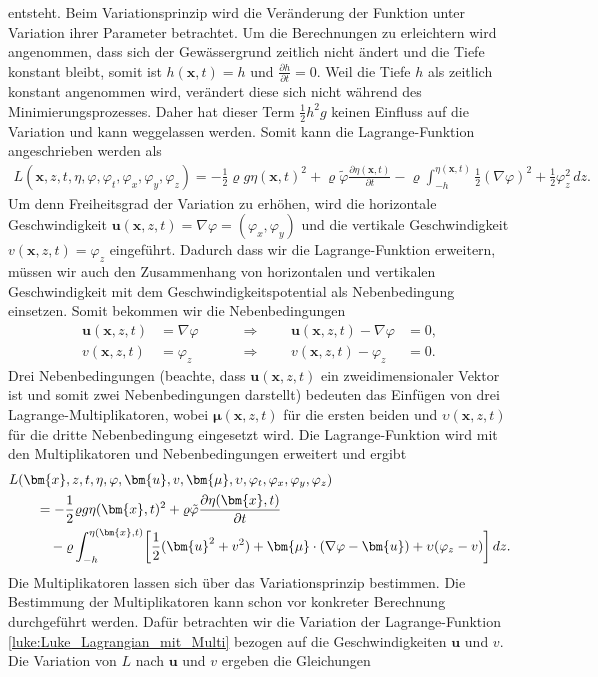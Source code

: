 entsteht.
Beim Variationsprinzip wird die Veränderung der Funktion unter Variation ihrer Parameter betrachtet.
Um die Berechnungen zu erleichtern wird angenommen, dass sich der Gewässergrund zeitlich nicht ändert und die Tiefe konstant bleibt, somit ist $h(\bm{x},t) = h$ und $\frac{\partial h}{\partial t} = 0$.
Weil die Tiefe $h$ als zeitlich konstant angenommen wird, verändert diese sich nicht während des Minimierungsprozesses.
Daher hat dieser Term $\frac{1}{2}h^2g$ keinen Einfluss auf die Variation und kann weggelassen werden.
Somit kann die Lagrange-Funktion angeschrieben werden als
\begin{align}
L(\bm{x},z,t,\eta,\varphi,\varphi_t,\varphi_x, \varphi_y, \varphi_z)
= 
-\frac{1}{2}\varrho g\eta(\bm{x},t)^2
+\varrho \tilde{\varphi}
\frac{\partial\eta(\bm{x},t)}{\partial t}
-\varrho \int_{-h}^{\eta(\bm{x},t)}
\frac{1}{2}(\nabla\varphi)^2 + \frac{1}{2}\varphi_z^2\, dz
.
\nonumber
\end{align}
Um denn Freiheitsgrad der Variation zu erhöhen, wird die horizontale Geschwindigkeit $\bm{u}(\bm{x},z,t) = \nabla\varphi = (\varphi_x, \varphi_y)$ und die vertikale Geschwindigkeit $v(\bm{x},z,t) = \varphi_z$ eingeführt. 
Dadurch dass wir die Lagrange-Funktion erweitern, müssen wir auch den Zusammenhang von horizontalen und vertikalen Geschwindigkeit mit dem Geschwindigkeitspotential als Nebenbedingung einsetzen.
Somit bekommen wir die Nebenbedingungen
\[
\begin{aligned}
	\bm{u}(\bm{x},z,t)
	&=
	\nabla\varphi
	&&&&\Rightarrow&&&
	\bm{u}(\bm{x},z,t)
	-
	\nabla\varphi
	&=
	0,
	\nonumber
	\\
	v(\bm{x},z,t)
	&=
	\varphi_z
	&&&&\Rightarrow&&&
	v(\bm{x},z,t)
	-
	\varphi_z
	&=
	0.
	\nonumber
\end{aligned}
\]
Drei Nebenbedingungen (beachte, dass $\bm{u}(\bm{x},z,t)$ ein zweidimensionaler Vektor ist und somit zwei Nebenbedingungen darstellt) bedeuten das Einfügen von drei Lagrange-Multi\-pli\-ka\-to\-ren, wobei $\bm{\mu}(\bm{x},z,t)$ für die ersten beiden und $\upsilon(\bm{x},z,t)$ für die dritte Nebenbedingung eingesetzt wird.
Die Lagrange-Funktion wird mit den Multiplikatoren und Nebenbedingungen erweitert und ergibt
\begin{align}
&L(\bm{x},z,t,\eta,\varphi,\bm{u}, v, \bm{\mu},\upsilon,\varphi_t,\varphi_x,\varphi_y,\varphi_z)
\notag
\\
&\qquad=
-
\frac{1}{2}\varrho  g \eta(\bm{x},t)^2
+
\varrho \tilde{\varphi} \frac{\partial\eta(\bm{x},t)}{\partial t}
\notag
\\
&\qquad\quad
-
\varrho \int_{-h}^{\eta(\bm{x},t)}
\biggl[
\frac{1}{2} (\bm{u}^2 + v^2) + \bm{\mu} \cdot (\nabla\varphi - \bm{u})
+ \upsilon  (\varphi_z - v)
\biggr]\, dz.
	\label{luke:Luke_Lagrangian_mit_Multi}
\end{align}
Die Multiplikatoren lassen sich über das Variationsprinzip bestimmen.
Die Bestimmung der Multiplikatoren kann schon vor konkreter Berechnung durchgeführt werden.
Dafür betrachten wir die Variation der Lagrange-Funktion \eqref{luke:Luke_Lagrangian_mit_Multi} bezogen auf die Geschwindigkeiten $\bm{u}$ und $v$.
Die Variation von $L$ nach $\bm{u}$ und $v$ ergeben die Gleichungen

